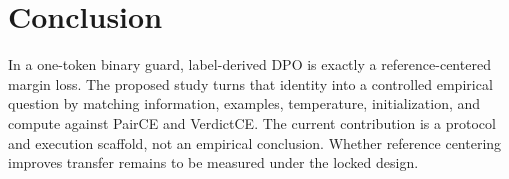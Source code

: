 \section{Conclusion}

In a one-token binary guard, label-derived DPO is exactly a reference-centered
margin loss. The proposed study turns that identity into a controlled empirical
question by matching information, examples, temperature, initialization, and
compute against PairCE and VerdictCE. The current contribution is a protocol and
execution scaffold, not an empirical conclusion. Whether reference centering
improves transfer remains to be measured under the locked design.

